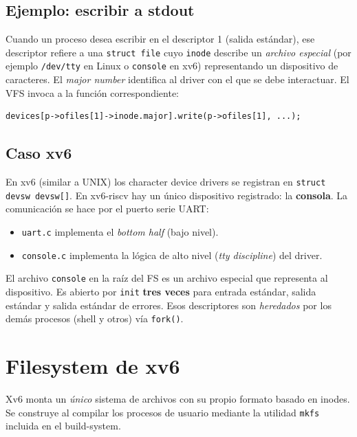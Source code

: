 \documentclass[11pt,a4paper]{article}
\begin{document}
\subsection{Ejemplo: escribir a stdout}

Cuando un proceso desea escribir en el descriptor 1 (salida estándar),
ese descriptor refiere a una \texttt{struct file} cuyo \texttt{inode}
describe un \emph{archivo especial} (por ejemplo \verb|/dev/tty| en
Linux o \texttt{console} en xv6) representando un dispositivo de
caracteres. El \emph{major number} identifica al driver con el que se
debe interactuar. El VFS invoca a la función correspondiente:

\begin{lstlisting}[style=cstyle]
devices[p->ofiles[1]->inode.major].write(p->ofiles[1], ...);
\end{lstlisting}

\subsection{Caso xv6}

En xv6 (similar a UNIX) los character device drivers se registran en
\verb|struct devsw devsw[]|. En xv6-riscv hay un único dispositivo
registrado: la \textbf{consola}. La comunicación se hace por el puerto
serie UART:

\begin{itemize}[leftmargin=*,nosep]
    \item \texttt{uart.c} implementa el \emph{bottom half} (bajo
        nivel).
    \item \texttt{console.c} implementa la lógica de alto nivel
        (\emph{tty discipline}) del driver.
\end{itemize}

El archivo \texttt{console} en la raíz del FS es un archivo especial
que representa al dispositivo. Es abierto por \texttt{init}
\textbf{tres veces} para entrada estándar, salida estándar y salida
estándar de errores. Esos descriptores son \emph{heredados} por los
demás procesos (shell y otros) vía \texttt{fork()}.

\section{Filesystem de xv6}

Xv6 monta un \emph{único} sistema de archivos con su propio formato
basado en inodes. Se construye al compilar los procesos de usuario
mediante la utilidad \texttt{mkfs} incluida en el build-system.
\end{document}
